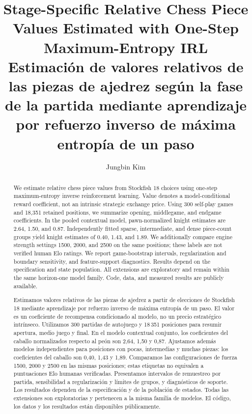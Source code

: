 \documentclass{jcst}
\title{Stage-Specific Relative Chess Piece Values Estimated with One-Step Maximum-Entropy IRL\\
\large Estimación de valores relativos de las piezas de ajedrez según la fase de la partida mediante aprendizaje por refuerzo inverso de máxima entropía de un paso}
\author[1\orcid{0009-0000-4719-1228}]{Jungbin Kim}
\affil[1]{UNIST Department of Engineering\authorcr
Corresponding author: \href{mailto:rlawjdqls1212@unist.ac.kr}{rlawjdqls1212@unist.ac.kr}\authorcr
ORCID: \href{https://orcid.org/0009-0000-4719-1228}{0009-0000-4719-1228}}
\begin{document}
\maketitle
\begin{abstract}
We estimate relative chess piece values from Stockfish 18 choices using one-step maximum-entropy inverse reinforcement learning. Value denotes a model-conditional reward coefficient, not an intrinsic strategic exchange price. Using 300 self-play games and 18,351 retained positions, we summarize opening, middlegame, and endgame coefficients. In the pooled contextual model, pawn-normalized knight estimates are 2.64, 1.50, and 0.87. Independently fitted sparse, intermediate, and dense piece-count groups yield knight estimates of 0.40, 1.43, and 1.89. We additionally compare engine strength settings 1500, 2000, and 2500 on the same positions; these labels are not verified human Elo ratings. We report game-bootstrap intervals, regularization and boundary sensitivity, and feature-support diagnostics. Results depend on the specification and state population. All extensions are exploratory and remain within the same horizon-one model family. Code, data, and measured results are publicly available.
\end{abstract}
\par
{}
\begin{abstract}
Estimamos valores relativos de las piezas de ajedrez a partir de elecciones de Stockfish 18 mediante aprendizaje por refuerzo inverso de máxima entropía de un paso. El valor es un coeficiente de recompensa condicionado al modelo, no un precio estratégico intrínseco. Utilizamos 300 partidas de autojuego y 18\,351 posiciones para resumir apertura, medio juego y final. En el modelo contextual conjunto, los coeficientes del caballo normalizados respecto al peón son 2,64, 1,50 y 0,87. Ajustamos además modelos independientes para posiciones con pocas, intermedias y muchas piezas: los coeficientes del caballo son 0,40, 1,43 y 1,89. Comparamos las configuraciones de fuerza 1500, 2000 y 2500 en las mismas posiciones; estas etiquetas no equivalen a puntuaciones Elo humanas verificadas. Presentamos intervalos de remuestreo por partida, sensibilidad a regularización y límites de grupos, y diagnósticos de soporte. Los resultados dependen de la especificación y de la población de estados. Todas las extensiones son exploratorias y pertenecen a la misma familia de modelos. El código, los datos y los resultados están disponibles públicamente.
\end{abstract}
\par
{}
\end{document}
